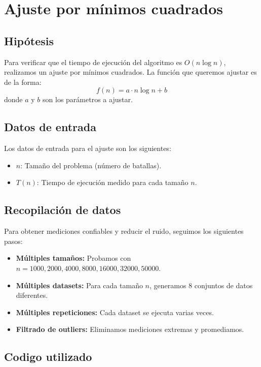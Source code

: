 \section{Ajuste por mínimos cuadrados}

\subsection{Hipótesis}

Para verificar que el tiempo de ejecución del algoritmo es $O(n \log n)$, realizamos un ajuste por mínimos cuadrados. La función que queremos ajustar es de la forma:
\[f(n) = a \cdot n \log n + b\]
donde $a$ y $b$ son los parámetros a ajustar.

\subsection{Datos de entrada}

Los datos de entrada para el ajuste son los siguientes:

\begin{itemize}
    \item $n$: Tamaño del problema (número de batallas).
    \item $T(n)$: Tiempo de ejecución medido para cada tamaño $n$.
\end{itemize}

\subsection{Recopilación de datos}

Para obtener mediciones confiables y reducir el ruido, seguimos los siguientes pasos:

\begin{itemize}
    \item \textbf{Múltiples tamaños:} Probamos con $n = 1000, 2000, 4000, 8000, 16000, 32000, 50000$.
    \item \textbf{Múltiples datasets:} Para cada tamaño $n$, generamos 8 conjuntos de datos diferentes.
    \item \textbf{Múltiples repeticiones:} Cada dataset se ejecuta varias veces.
    \item \textbf{Filtrado de outliers:} Eliminamos mediciones extremas y promediamos.
\end{itemize}

\subsection{Codigo utilizado}

